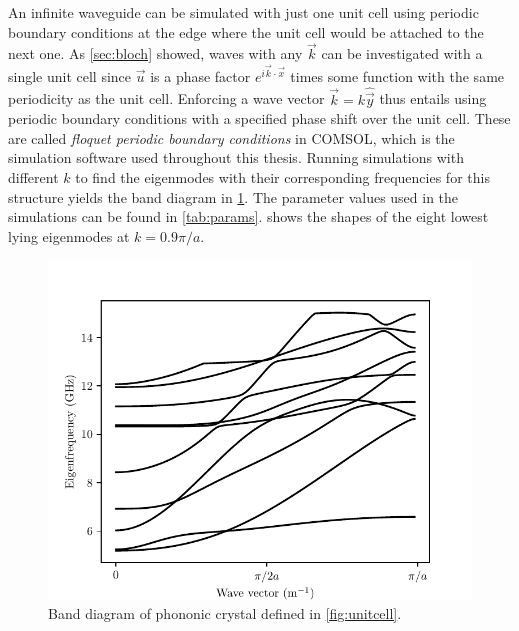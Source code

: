 An infinite waveguide can be simulated with just one unit cell using periodic
boundary conditions at the edge where the unit cell would be attached to the
next one.
As \cref{sec:bloch} showed,
waves with any $\vec k$ can be investigated with a single unit cell since $\vec
u$ is a phase factor $e^{i\vec k \cdot \vec x}$ times some function with the
same periodicity as the unit cell.
Enforcing a wave vector $\vec k = k\hat{\vec y}$
thus entails using periodic boundary conditions with a specified phase shift
over the unit cell.
These are called \emph{floquet periodic boundary conditions} in COMSOL, which is
the simulation software used throughout this thesis.
Running simulations with different $k$
to find the eigenmodes with their
corresponding frequencies for this structure yields the band diagram in
\cref{fig:banddiagram}.
The parameter values used in the simulations can be found in \cref{tab:params}.
 shows the shapes of the eight lowest lying eigenmodes at
$k=0.9 \pi / a$.
\begin{figure}[htpb]
	\centering
	\includegraphics{chapters/theory/bandstructure.pdf}
	\caption{%
		Band diagram of phononic crystal defined in \cref{fig:unitcell}.
	}%
	\label{fig:banddiagram}
\end{figure}

